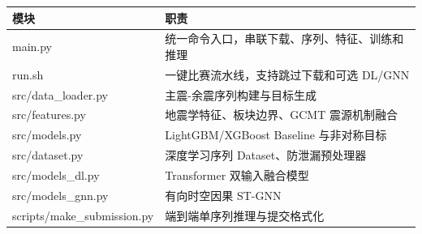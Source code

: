 \begingroup
\footnotesize
\setlength{\tabcolsep}{4pt}
\begin{tabular}{p{}p{}}
\toprule
模块 & 职责 \\
\midrule
main.py & 统一命令入口，串联下载、序列、特征、训练和推理 \\
run.sh & 一键比赛流水线，支持跳过下载和可选 DL/GNN \\
src/data\_loader.py & 主震-余震序列构建与目标生成 \\
src/features.py & 地震学特征、板块边界、GCMT 震源机制融合 \\
src/models.py & LightGBM/XGBoost Baseline 与非对称目标 \\
src/dataset.py & 深度学习序列 Dataset、防泄漏预处理器 \\
src/models\_dl.py & Transformer 双输入融合模型 \\
src/models\_gnn.py & 有向时空因果 ST-GNN \\
scripts/make\_submission.py & 端到端单序列推理与提交格式化 \\
\bottomrule
\end{tabular}
\endgroup
